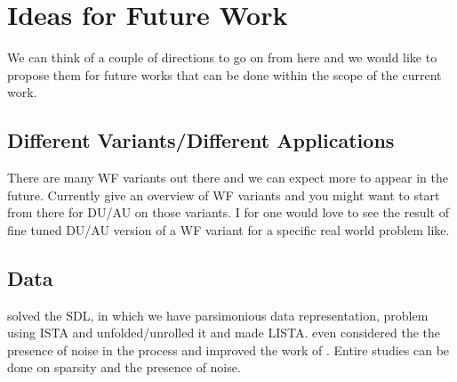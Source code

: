 



\section*{Ideas for Future Work}

We can think of a couple of directions to go on from here and we would like to propose them for future works that can be done within the scope of 
the current work.

\subsection*{Different Variants/Different Applications}

There are many \ac{WF}\cite{Jaganathan2015}\cite{Liu2019} variants out there and we can expect more to appear in the future. 
Currently \cite{Jaganathan2015}\cite{Liu2019}\cite{Chandra2017} give an overview of \ac{WF} variants and you might want to start from there for 
\ac{DU}/\ac{AU}\cite{Monga2019} on those variants. I for one would love to see the result of fine tuned 
\ac{DU}/\ac{AU}\cite{Monga2019} version of a \ac{WF} variant for a specific real world problem like\cite{Fogel2013}. 

\subsection*{Data}

\cite{Daubechies2003} solved the \ac{SDL}, in which we have parsimonious\cite{Foucart2013} data representation, 
problem using \ac{ISTA} and \cite{Gregor2010} unfolded/unrolled it and made \ac{LISTA}. \cite{Aberdam2020} even considered the the presence of noise in the process and improved the work of \cite{Gregor2010}. 
Entire studies can be done on sparsity and the presence of noise.

